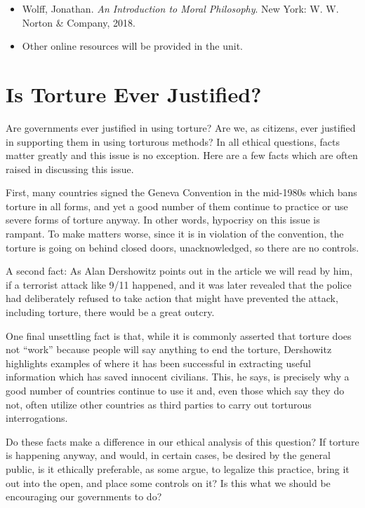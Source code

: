 \documentclass[
]{book}
\providecommand{\tightlist}{%
  \setlength{\itemsep}{0pt}\setlength{\parskip}{0pt}}
\begin{document}
\begin{itemize}
\tightlist
\item
  Wolff, Jonathan. \emph{An Introduction to Moral Philosophy}. New York: W. W. Norton \& Company, 2018.
\item
  Other online resources will be provided in the unit.
\end{itemize}

\hypertarget{is-torture-ever-justified}{%
\section{Is Torture Ever Justified?}\label{is-torture-ever-justified}}

Are governments ever justified in using torture? Are we, as citizens, ever justified in supporting them in using torturous methods? In all ethical questions, facts matter greatly and this issue is no exception. Here are a few facts which are often raised in discussing this issue.

First, many countries signed the Geneva Convention in the mid-1980s which bans torture in all forms, and yet a good number of them continue to practice or use severe forms of torture anyway. In other words, hypocrisy on this issue is rampant. To make matters worse, since it is in violation of the convention, the torture is going on behind closed doors, unacknowledged, so there are no controls.

A second fact: As Alan Dershowitz points out in the article we will read by him, if a terrorist attack like 9/11 happened, and it was later revealed that the police had deliberately refused to take action that might have prevented the attack, including torture, there would be a great outcry.

One final unsettling fact is that, while it is commonly asserted that torture does not ``work'' because people will say anything to end the torture, Dershowitz highlights examples of where it has been successful in extracting useful information which has saved innocent civilians. This, he says, is precisely why a good number of countries continue to use it and, even those which say they do not, often utilize other countries as third parties to carry out torturous interrogations.

Do these facts make a difference in our ethical analysis of this question? If torture is happening anyway, and would, in certain cases, be desired by the general public, is it ethically preferable, as some argue, to legalize this practice, bring it out into the open, and place some controls on it? Is this what we should be encouraging our governments to do?
\end{document}
